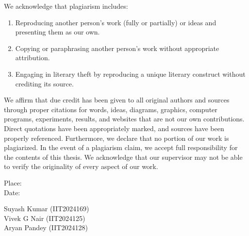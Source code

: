 \documentclass[11pt,a4paper,oneside]{report}
\begin{document}
We acknowledge that plagiarism includes:
\begin{enumerate}
\item Reproducing another person's work (fully or partially) or ideas and presenting them as our own.
\item Copying or paraphrasing another person's work without appropriate attribution.
\item Engaging in literary theft by reproducing a unique literary construct without crediting its source.
\end{enumerate}
We affirm that due credit has been given to all original authors and sources through proper citations for words,
ideas, diagrams, graphics, computer programs, experiments, results, and websites that are not our own contributions.
Direct quotations have been appropriately marked, and sources have been properly referenced. Furthermore, we declare
that no portion of our work is plagiarized. In the event of a plagiarism claim, we accept full responsibility for the
contents of this thesis. We acknowledge that our supervisor may not be able to verify the originality of every aspect
of our work.

\vspace{0.6cm}
\begin{singlespace}
\noindent
\begin{minipage}[t]{0.45\textwidth}
Place:\\[6pt]
Date:
\end{minipage}\hfill
\begin{minipage}[t]{0.45\textwidth}
\raggedleft
Suyash Kumar (IIT2024169)\\[16pt]
Vivek G Nair (IIT2024125)\\[16pt]
Aryan Pandey (IIT2024128)
\end{minipage}
\end{singlespace}
\clearpage
\end{document}
